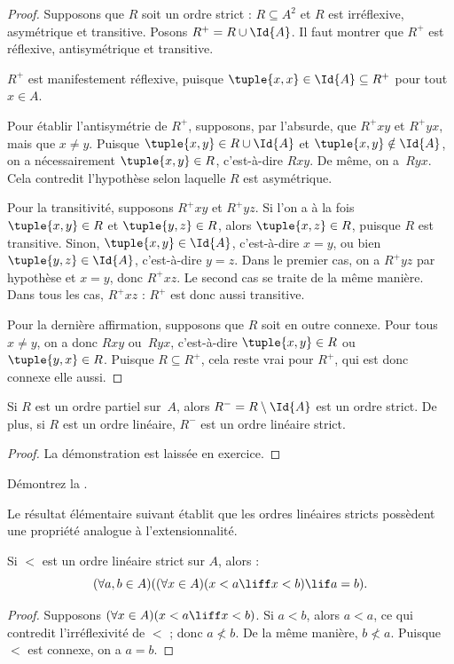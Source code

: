 \documentclass[../../../include/open-logic-section]{subfiles}
\begin{document}
\begin{proof}
Supposons que $R$ soit un ordre strict : $R \subseteq A^2$ et $R$ est
irréflexive, asymétrique et transitive. Posons $R^+ = R \cup \Id{A}$.
Il faut montrer que $R^+$ est réflexive, antisymétrique et transitive.

$R^+$ est manifestement réflexive, puisque
$\tuple{x, x} \in \Id{A} \subseteq R^+$ pour tout $x \in A$.

Pour établir l’antisymétrie de $R^+$, supposons, par l’absurde, que
$R^+xy$ et $R^+yx$, mais que $x \neq y$. Puisque
$\tuple{x,y} \in R \cup \Id{A}$ et $\tuple{x, y} \notin \Id{A}$,
on a nécessairement $\tuple{x, y} \in R$, c’est-à-dire $Rxy$.
De même, on a~$Ryx$. Cela contredit l’hypothèse selon laquelle $R$
est asymétrique.

Pour la transitivité, supposons $R^+xy$ et $R^+yz$. Si l’on a à la fois
$\tuple{x, y} \in R$ et $\tuple{y,z} \in R$, alors
$\tuple{x, z} \in R$, puisque $R$ est transitive. Sinon,
$\tuple{x, y} \in \Id{A}$, c’est-à-dire $x = y$, ou bien
$\tuple{y, z} \in \Id{A}$, c’est-à-dire $y = z$.
Dans le premier cas, on a $R^+yz$ par hypothèse et $x = y$, donc $R^+xz$.
Le second cas se traite de la même manière. Dans tous les cas, $R^+xz$ :
$R^+$ est donc aussi transitive.

Pour la dernière affirmation, supposons que $R$ soit en outre connexe.
Pour tous $x \neq y$, on a donc $Rxy$ ou~$Ryx$, c’est-à-dire
$\tuple{x, y} \in R$ ou $\tuple{y, x} \in R$.
Puisque $R \subseteq R^+$, cela reste vrai pour $R^+$, qui est donc
connexe elle aussi.
\end{proof}

\begin{prop}
Si $R$ est un ordre partiel sur~$A$, alors $R^- = R \setminus \Id{A}$
est un ordre strict. De plus, si $R$ est un ordre linéaire, $R^-$ est
un ordre linéaire strict.
\end{prop}

\begin{proof}
La démonstration est laissée en exercice.
\end{proof}

\begin{prob}
Démontrez la .
\end{prob}

Le résultat élémentaire suivant établit que les ordres linéaires stricts
possèdent une propriété analogue à l’extensionnalité.

\begin{prop}
Si $<$ est un ordre linéaire strict sur $A$, alors :
\[
  (\forall a, b \in A)((\forall x \in A)(x < a \liff x < b) \lif a = b).
\]
\end{prop}

\begin{proof}
Supposons $(\forall x \in A)(x < a \liff x < b)$. Si $a < b$, alors
$a < a$, ce qui contredit l’irréflexivité de $<$ ; donc $a \nless b$.
De la même manière, $b \nless a$. Puisque $<$ est connexe, on a $a = b$.
\end{proof}
\end{document}
